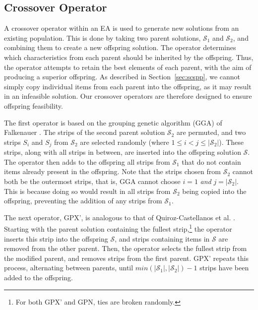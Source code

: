 \documentclass{elsarticle}
\begin{document}
\subsection{Crossover Operator}
\label{sub:xover}
A crossover operator within an EA is used to generate new solutions from an existing population. This is done by taking two parent solutions, $\mathcal{S}_1$ and $\mathcal{S}_2$, and combining them to create a new offspring solution. The operator determines which characteristics from each parent should be inherited by the offspring. Thus, the operator attempts to retain the best elements of each parent, with the aim of producing a superior offspring. As described in Section~\ref{sec:scspp}, we cannot simply copy individual items from each parent into the offspring, as it may result in an infeasible solution. Our crossover operators are therefore designed to ensure offspring feasibility.

The first operator is based on the grouping genetic algorithm (GGA) of Falkenauer \cite{falkenauer1992}. The strips of the second parent solution $\mathcal{S}_2$ are permuted, and two strips $S_i$ and $S_j$ from $\mathcal{S}_2$ are selected randomly (where $1 \leq i < j \leq |\mathcal{S}_2|$). These strips, along with all strips in between, are inserted into the offspring solution $\mathcal{S}$. The operator then adds to the offspring all strips from $\mathcal{S}_1$ that do not contain items already present in the offspring. Note that the strips chosen from $\mathcal{S}_2$ cannot both be the outermost strips, that is, GGA cannot choose $i = 1$ \emph{and} $j = |\mathcal{S}_2|$. This is because doing so would result in all strips from $\mathcal{S}_2$ being copied into the offspring, preventing the addition of any strips from $\mathcal{S}_1$.


The next operator, \alert{GPX'}, is analogous to that of Quiroz-Castellanos et al. \cite{quiroz2015}. Starting with the parent solution containing the fullest strip,\footnote{For both \alert{GPX'} and \alert{GPN}, ties are broken randomly.} the operator inserts this strip into the offspring $\mathcal{S}$, and strips containing items in $\mathcal{S}$ are removed from the other parent. Then, the operator selects the fullest strip from the modified parent, and removes strips from the first parent. GPX' repeats this process, alternating between parents, until $min (|\mathcal{S}_1|,|\mathcal{S}_2|) - 1$ strips have been added to the offspring.
\end{document}
